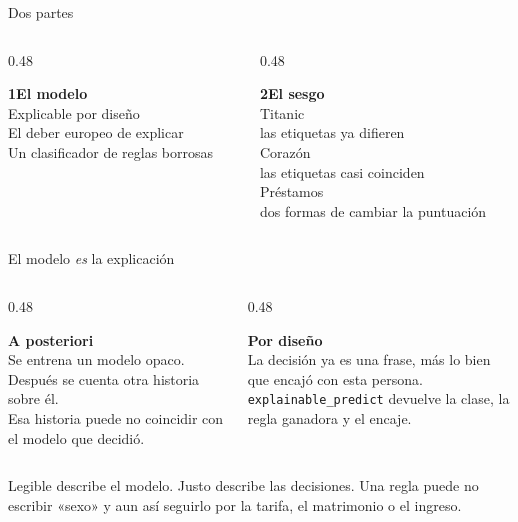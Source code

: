 \documentclass[aspectratio=169,11pt]{beamer}
\newcommand{\hilite}[1]{\textcolor{ebdnavy}{\textit{#1}}}
\begin{document}
\begin{frame}{Dos partes}
  \begin{columns}[T]
    \begin{column}{0.48\textwidth}
      \colorbox{ebdcard}{\parbox[t]{0.92\textwidth}{%
        {\color{ebdnavy}\large\bfseries 1\quad El modelo}\\[0.45em]
        Explicable por diseño\\[0.25em]
        El deber europeo de explicar\\[0.25em]
        Un clasificador de reglas borrosas}}
    \end{column}
    \begin{column}{0.48\textwidth}
      \colorbox{ebdcard}{\parbox[t]{0.92\textwidth}{%
        {\color{ebdgreen}\large\bfseries 2\quad El sesgo}\\[0.45em]
        Titanic\\
        las etiquetas ya difieren\\[0.3em]
        Corazón\\
        las etiquetas casi coinciden\\[0.3em]
        Préstamos\\
        dos formas de cambiar la puntuación}}
    \end{column}
  \end{columns}
\end{frame}

\begin{frame}{El modelo \hilite{es} la explicación}
  \begin{columns}[T]
    \begin{column}{0.48\textwidth}
      \colorbox{ebdcard}{\parbox[t]{0.92\textwidth}{%
        \raggedright
        {\color{ebdnavy}\textbf{A posteriori}}\\[0.4em]
        Se entrena un modelo opaco.\\
        Después se cuenta otra historia sobre él.\\[0.45em]
        {\small\color{ebdmuted}Esa historia puede no coincidir con el modelo que decidió.}\par}}
    \end{column}
    \begin{column}{0.48\textwidth}
      \colorbox{ebdsage}{\parbox[t]{0.92\textwidth}{%
        \raggedright
        {\color{ebdgreen}\textbf{Por diseño}}\\[0.4em]
        La decisión ya es una frase, más lo bien que encajó con esta persona.\\[0.45em]
        {\small\texttt{explainable\_predict} devuelve la clase, la regla ganadora y el encaje.}\par}}
    \end{column}
  \end{columns}
  \vspace{0.7em}
  {\small Legible describe el modelo. Justo describe las decisiones. Una regla puede no escribir «sexo» y aun así seguirlo por la tarifa, el matrimonio o el ingreso.}
\end{frame}
\end{document}
